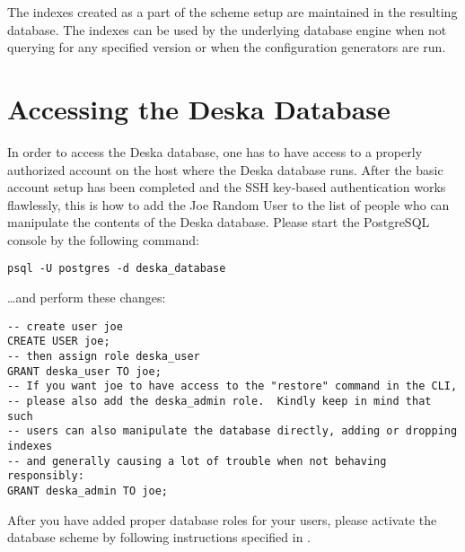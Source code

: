 \documentclass[deska]{subfiles}
\begin{document}
The indexes created as a part of the scheme setup are maintained in the resulting database.  The indexes can be used by
the underlying database engine when not querying for any specified version or when the configuration generators are run.

\section{Accessing the Deska Database}

In order to access the Deska database, one has to have access to a properly authorized account on the host where the
Deska database runs.  After the basic account setup has been completed and the SSH key-based authentication works
flawlessly, this is how to add the Joe Random User to the list of people who can manipulate the contents of the Deska
database.  Please start the PostgreSQL console by the following command:

{\tt psql -U postgres -d deska\_database}

\ldots and perform these changes:

\begin{verbatim}
-- create user joe
CREATE USER joe;
-- then assign role deska_user
GRANT deska_user TO joe;
-- If you want joe to have access to the "restore" command in the CLI,
-- please also add the deska_admin role.  Kindly keep in mind that such
-- users can also manipulate the database directly, adding or dropping indexes
-- and generally causing a lot of trouble when not behaving responsibly:
GRANT deska_admin TO joe;
\end{verbatim}

After you have added proper database roles for your users, please activate the database scheme by following instructions
specified in .
\end{document}

